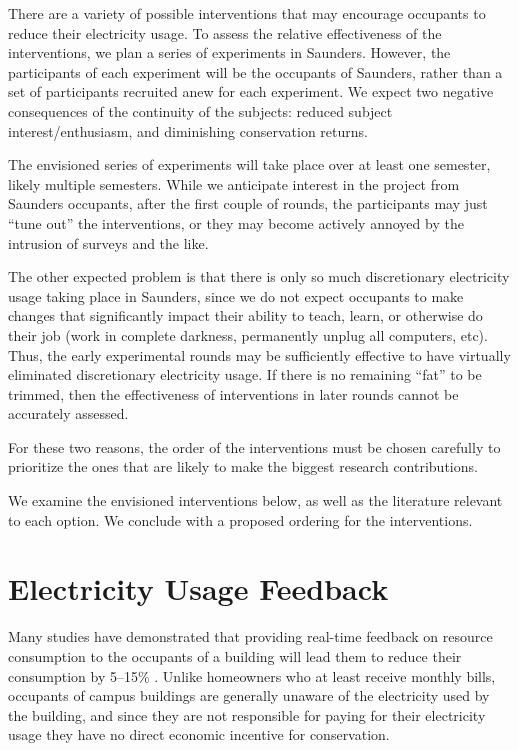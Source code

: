 \documentclass[11pt]{article}
\begin{document}
There are a variety of possible interventions that may encourage occupants to reduce their electricity usage. To assess the relative effectiveness of the interventions, we plan a series of experiments in Saunders. However, the participants of each experiment will be the occupants of Saunders, rather than a set of participants recruited anew for each experiment. We expect two negative consequences of the continuity of the subjects: reduced subject interest/enthusiasm, and diminishing conservation returns.

The envisioned series of experiments will take place over at least one semester, likely multiple semesters. While we anticipate interest in the project from Saunders occupants, after the first couple of rounds, the participants may just ``tune out'' the interventions, or they may become actively annoyed by the intrusion of surveys and the like.

The other expected problem is that there is only so much discretionary electricity usage taking place in Saunders, since we do not expect occupants to make changes that significantly impact their ability to teach, learn, or otherwise do their job (work in complete darkness, permanently unplug all computers, etc). Thus, the early experimental rounds may be sufficiently effective to have virtually eliminated discretionary electricity usage. If there is no remaining ``fat'' to be trimmed, then the effectiveness of interventions in later rounds cannot be accurately assessed.

For these two reasons, the order of the interventions must be chosen carefully to prioritize the ones that are likely to make the biggest research contributions.

We examine the envisioned interventions below, as well as the literature relevant to each option. We conclude with a proposed ordering for the interventions.

\section{Electricity Usage Feedback}
\label{sec:feedback}

Many studies have demonstrated that providing real-time feedback on resource consumption to the occupants of a building will lead them to reduce their consumption by 5--15\% \cite{darby-review-2006}. Unlike homeowners who at least receive monthly bills, occupants of campus buildings are generally unaware of the electricity used by the building, and since they are not responsible for paying for their electricity usage they have no direct economic incentive for conservation.
\end{document}
